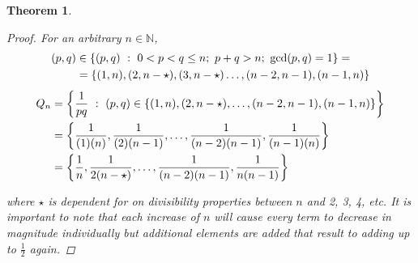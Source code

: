 \documentclass[]{article}
\newcommand{\N}{\mathbb{N}}
\newcommand{\st}{\ : \ }
\newtheorem{theorem}{Theorem}
\begin{document}
\begin{theorem}
\begin{proof}


        For an arbitrary $n \in \N$,
        \begin{align*}
            (p,q) &\in \qty{(p,q) \st 0 < p < q \leq n; \ p + q > n; \ \gcd(p,q) = 1} =\\
                &= \qty{(1,n), (2,n - \star), (3, n - \star) \dots, (n-2, n-1), (n-1, n)}
        \end{align*}
        \begin{align*}
            Q_n &= \qty{\frac{1}{pq} \st (p,q) \in \qty{(1,n), (2,n-\star), \dots, (n-2, n-1), (n-1, n)}}\\
                &= \qty{\frac{1}{(1)(n)}, \frac{1}{(2)(n-1)}, \dots, \frac{1}{(n-2)(n-1)}, \frac{1}{(n-1)(n)}}\\
                &= \qty{\frac{1}{n}, \frac{1}{2(n-\star)}, \dots, \frac{1}{(n-2)(n-1)}, \frac{1}{n(n-1)}}
        \end{align*}

        where $\star$ is dependent for on divisibility properties between $n$ and 2, 3, 4, etc.
        It is important to note that each increase of $n$ will cause every term to decrease in magnitude individually but additional elements are added that result to adding up to $\frac{1}{2}$ again.


\end{proof}
\end{theorem}
\end{document}
